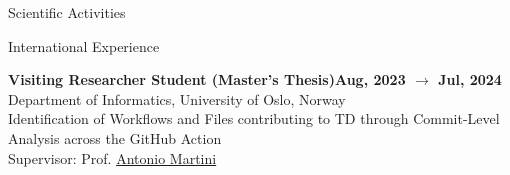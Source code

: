 \documentclass{resume} %
\begin{document}

    \begin{rSection}{Scientific Activities}



        \begin{rSubsection2}{International Experience}

            \item\textbf{ Visiting Researcher Student (Master's Thesis)}\hfill \textbf{Aug, 2023 $\rightarrow$ Jul, 2024}
            \\Department of Informatics, University of Oslo, Norway
            \\Identification of Workflows and Files contributing to TD through Commit-Level Analysis across the GitHub Action
            \\Supervisor: Prof. \href{mailto:antonima@ifi.uio.no}{Antonio Martini}

        \end{rSubsection2}

    \end{rSection}
\end{document}
